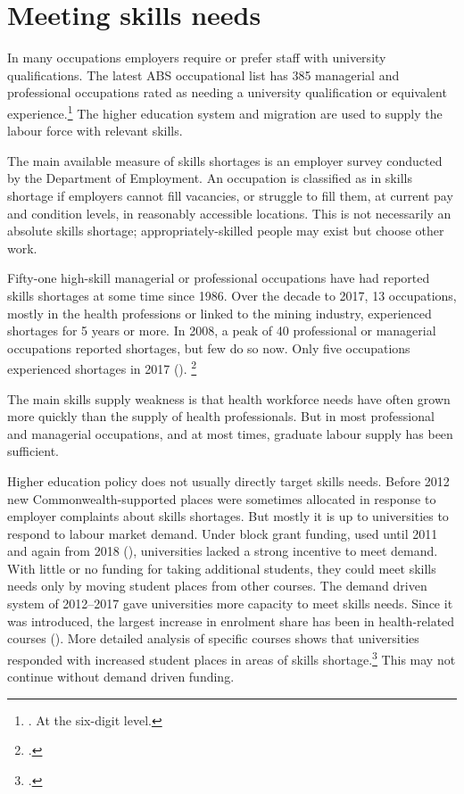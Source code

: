 \documentclass{grattan}
\begin{document}
%
\section{Meeting skills needs }\label{sec:meeting-skills-needs}

In many occupations employers require or prefer staff with university qualifications. The latest ABS occupational list has 385 managerial and professional occupations rated as needing a university qualification or equivalent experience.\footnote{\textcite[][]{ABS2013australiaandnewz}. At the six-digit level.} The higher education system and migration are used to supply the labour force with relevant skills.

The main available measure of skills shortages is an employer survey conducted by the Department of Employment. An occupation is classified as in skills shortage if employers cannot fill vacancies, or struggle to fill them, at current pay and condition levels, in reasonably accessible locations. This is not necessarily an absolute skills shortage; appropriately-skilled people may exist but choose other work.

Fifty-one high-skill managerial or professional occupations have had reported skills shortages at some time since 1986. Over the decade to 2017, 13 occupations, mostly in the health professions or linked to the mining industry, experienced shortages for 5 years or more. In 2008, a peak of 40 professional or managerial occupations reported shortages, but few do so now. Only five occupations experienced shortages in 2017 (). \footcite[][]{DepartmentofJobsandSmallBusiness2018historicallistof}

The main skills supply weakness is that health workforce needs have often grown more quickly than the supply of health professionals. But in most professional and managerial occupations, and at most times, graduate labour supply has been sufficient.

Higher education policy does not usually directly target skills needs. Before 2012 new Commonwealth-supported places were sometimes allocated in response to employer complaints about skills shortages. But mostly it is up to universities to respond to labour market demand. Under block grant funding, used until 2011 and again from 2018 (), universities lacked a strong incentive to meet demand. With little or no funding for taking additional students, they could meet skills needs only by moving student places from other courses. The demand driven system of 2012--2017 gave universities more capacity to meet skills needs. Since it was introduced, the largest increase in enrolment share has been in health-related courses (). More detailed analysis of specific courses shows that universities responded with increased student places in areas of skills shortage.\footcites[][chapter~3]{Kemp2014reviewofthedeman}[][]{Norton2017universitiesandth} This may not continue without demand driven funding.
\end{document}

